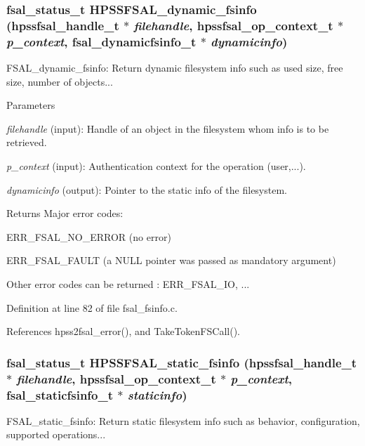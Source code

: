 \subsubsection[{HPSSFSAL\_\-dynamic\_\-fsinfo}]{\setlength{\rightskip}{0pt plus 5cm}fsal\_\-status\_\-t HPSSFSAL\_\-dynamic\_\-fsinfo (hpssfsal\_\-handle\_\-t $\ast$ {\em filehandle}, \/  hpssfsal\_\-op\_\-context\_\-t $\ast$ {\em p\_\-context}, \/  fsal\_\-dynamicfsinfo\_\-t $\ast$ {\em dynamicinfo})}\label{fsal__fsinfo_8c_a33c400195e8b5ef57a84301246e1c557}
FSAL\_\-dynamic\_\-fsinfo: Return dynamic filesystem info such as used size, free size, number of objects...


\begin{DoxyParams}{Parameters}
\item[{\em filehandle}](input): Handle of an object in the filesystem whom info is to be retrieved. \item[{\em p\_\-context}](input): Authentication context for the operation (user,...). \item[{\em dynamicinfo}](output): Pointer to the static info of the filesystem.\end{DoxyParams}
\begin{DoxyReturn}{Returns}
Major error codes:
\begin{DoxyItemize}
\item ERR\_\-FSAL\_\-NO\_\-ERROR (no error)
\item ERR\_\-FSAL\_\-FAULT (a NULL pointer was passed as mandatory argument)
\item Other error codes can be returned : ERR\_\-FSAL\_\-IO, ... 
\end{DoxyItemize}
\end{DoxyReturn}


Definition at line 82 of file fsal\_\-fsinfo.c.

References hpss2fsal\_\-error(), and TakeTokenFSCall().
\subsubsection[{HPSSFSAL\_\-static\_\-fsinfo}]{\setlength{\rightskip}{0pt plus 5cm}fsal\_\-status\_\-t HPSSFSAL\_\-static\_\-fsinfo (hpssfsal\_\-handle\_\-t $\ast$ {\em filehandle}, \/  hpssfsal\_\-op\_\-context\_\-t $\ast$ {\em p\_\-context}, \/  fsal\_\-staticfsinfo\_\-t $\ast$ {\em staticinfo})}\label{fsal__fsinfo_8c_a22524fcdc932a774cb57b2dd6b243c09}
FSAL\_\-static\_\-fsinfo: Return static filesystem info such as behavior, configuration, supported operations...


